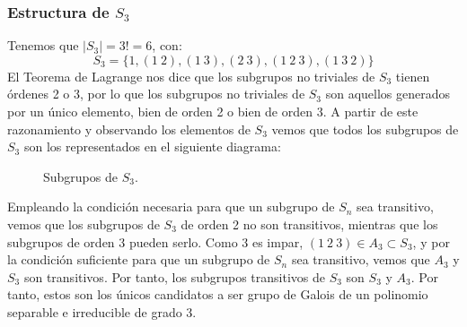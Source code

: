 \subsubsection{Estructura de $S_3$}
\noindent
Tenemos que $|S_3| = 3! = 6$, con:
\begin{equation*}
    S_3 = \{1, (1\ 2), (1\ 3), (2\ 3), (1\ 2\ 3), (1\ 3\ 2)\}
\end{equation*}
El Teorema de Lagrange nos dice que los subgrupos no triviales de $S_3$ tienen órdenes 2 o 3, por lo que los subgrupos no triviales de $S_3$ son aquellos generados por un único elemento, bien de orden 2 o bien de orden 3. A partir de este razonamiento y observando los elementos de $S_3$ vemos que todos los subgrupos de $S_3$ son los representados en el siguiente diagrama:
            \begin{figure}[H]
                \centering
                \caption{Subgrupos de $S_3$.}
            \end{figure}

Empleando la condición necesaria para que un subgrupo de $S_n$ sea transitivo, vemos que los subgrupos de $S_3$ de orden 2 no son transitivos, mientras que los subgrupos de orden 3 pueden serlo. Como $3$ es impar, $(1\ 2\ 3)\in A_3\subset S_3$, y por la condición suficiente para que un subgrupo de $S_n$ sea transitivo, vemos que $A_3$ y $S_3$ son transitivos. Por tanto, los subgrupos transitivos de $S_3$ son $S_3$ y $A_3$. Por tanto, estos son los únicos candidatos a ser grupo de Galois de un polinomio separable e irreducible de grado 3.

